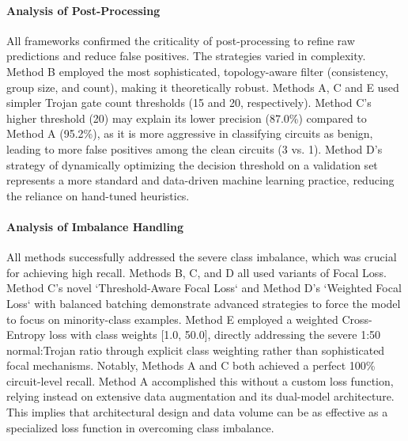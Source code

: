 \documentclass[conference]{IEEEtran}
\begin{document}
\paragraph{Analysis of Post-Processing}
All frameworks confirmed the criticality of post-processing to refine raw predictions and reduce false positives. The strategies varied in complexity. Method B employed the most sophisticated, topology-aware filter (consistency, group size, and count), making it theoretically robust. Methods A, C and E used simpler Trojan gate count thresholds (15 and 20, respectively). Method C's higher threshold (20) may explain its lower precision (87.0\%) compared to Method A (95.2\%), as it is more aggressive in classifying circuits as benign, leading to more false positives among the clean circuits (3 vs. 1). Method D's strategy of dynamically optimizing the decision threshold on a validation set represents a more standard and data-driven machine learning practice, reducing the reliance on hand-tuned heuristics. 

\paragraph{Analysis of Imbalance Handling}
All methods successfully addressed the severe class imbalance, which was crucial for achieving high recall. Methods B, C, and D all used variants of Focal Loss. Method C's novel `Threshold-Aware Focal Loss` and Method D's `Weighted Focal Loss` with balanced batching demonstrate advanced strategies to force the model to focus on minority-class examples. Method E employed a weighted Cross-Entropy loss with class weights [1.0, 50.0], directly addressing the severe 1:50 normal:Trojan ratio through explicit class weighting rather than sophisticated focal mechanisms. Notably, Methods A and C both achieved a perfect 100\% circuit-level recall. Method A accomplished this without a custom loss function, relying instead on extensive data augmentation and its dual-model architecture. This implies that architectural design and data volume can be as effective as a specialized loss function in overcoming class imbalance.

\FloatBarrier
\end{document}

